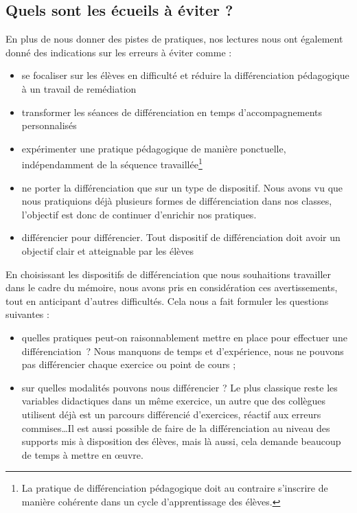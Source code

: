 \subsection{Quels sont les écueils à éviter ?}
En plus de nous donner des pistes de pratiques, nos lectures nous ont également donné des indications sur les erreurs à éviter comme :
\begin{itemize}
	\item se focaliser sur les élèves en difficulté et réduire la différenciation pédagogique à un travail de remédiation\cite{Eduscol}\cite{renc_pedago}
	\item transformer les séances de différenciation en temps d'accompagnements personnalisés\cite{Eduscol}
	\item expérimenter une pratique pédagogique de manière ponctuelle, indépendamment de la séquence travaillée\cite{renc_pedago}\footnote{La pratique de différenciation pédagogique doit au contraire s'inscrire de manière cohérente dans un cycle d'apprentissage des élèves.}
	\item ne porter la différenciation que sur un type de dispositif. Nous avons vu que nous pratiquions déjà plusieurs formes de différenciation dans nos classes, l'objectif est donc de continuer d'enrichir nos pratiques.
	\item différencier pour différencier. Tout dispositif de différenciation doit avoir un objectif clair et atteignable par les élèves\cite{Eduscol}\cite{Meirieu_différenciation}\cite{cnesco_notes_experts}
\end{itemize}
En choisissant les dispositifs de différenciation que nous souhaitions travailler dans le cadre du mémoire, nous avons pris en considération ces avertissements, tout en anticipant d'autres difficultés. Cela nous a fait formuler les questions suivantes :
\begin{itemize}
	\item quelles pratiques peut-on raisonnablement mettre en place pour effectuer une différenciation ? Nous manquons de temps et d’expérience, nous ne pouvons pas différencier chaque exercice ou point de cours ;
	\item sur quelles modalités pouvons nous différencier ? Le plus classique reste les variables didactiques dans un même exercice, un autre que des collègues utilisent déjà est un parcours différencié d’exercices, réactif aux erreurs commises\ldots Il est aussi possible de faire de la différenciation au niveau des supports mis à disposition des élèves, mais là aussi, cela demande beaucoup de temps à mettre en \oe{}uvre.
\end{itemize}

